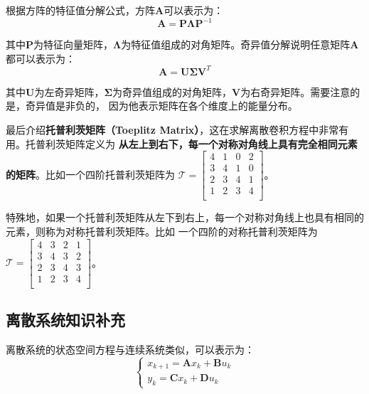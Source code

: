 根据方阵的特征值分解公式，方阵\(\bm{A}\)可以表示为：
\begin{equation*}
    \bm{A} = \bm{P}\bm{\Lambda}\bm{P}^{-1}
\end{equation*}

其中\(\bm{P}\)为特征向量矩阵，\(\bm{\Lambda}\)为特征值组成的对角矩阵。奇异值分解说明任意矩阵\(\bm{A}\)都可以表示为：
\begin{equation}
    \bm{A} = \bm{U}\bm{\Sigma}\bm{V}^T
    \label{eq:奇异值分解}
\end{equation}

其中\(\bm{U}\)为左奇异矩阵，\(\bm{\Sigma}\)为奇异值组成的对角矩阵，\(\bm{V}\)为右奇异矩阵。需要注意的是，奇异值是非负的，
因为他表示矩阵在各个维度上的能量分布。

最后介绍\textbf{托普利茨矩阵（Toeplitz Matrix）}，这在求解离散卷积方程中非常有用。托普利茨矩阵定义为
\textbf{从左上到右下，每一个对称对角线上具有完全相同元素的矩阵}。比如一个四阶托普利茨矩阵为
\(
\bm{\mathcal{T}} = 
\begin{bmatrix}
    4 & 1 & 0 & 2 \\
    3 & 4 & 1 & 0 \\
    2 & 3 & 4 & 1 \\
    1 & 2 & 3 & 4 \\
\end{bmatrix}
\)。

特殊地，如果一个托普利茨矩阵从左下到右上，每一个对称对角线上也具有相同的元素，则称为对称托普利茨矩阵。比如
一个四阶的对称托普利茨矩阵为
\(
\bm{\mathcal{T}} = 
\begin{bmatrix}
    4 & 3 & 2 & 1 \\
    3 & 4 & 3 & 2 \\
    2 & 3 & 4 & 3 \\
    1 & 2 & 3 & 4 \\
\end{bmatrix}
\)。

\subsection{离散系统知识补充}
离散系统的状态空间方程与连续系统类似，可以表示为：
\begin{equation}
    \begin{cases}
        x_{k+1} = \bm{A} x_{k} + \bm{B} u_{k} \\
        y_{k} = \bm{C} x_{k} + \bm{D} u_{k}
    \end{cases}
    \label{eq:离散状态空间方程}
\end{equation}

